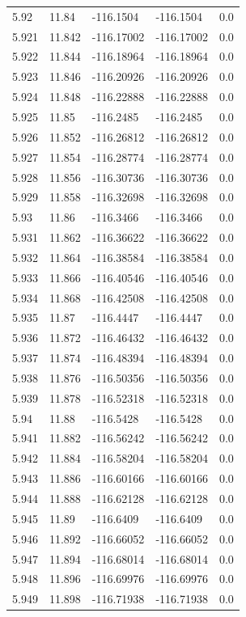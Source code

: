 \begin{tabular}{lllll}
5.92 & 11.84 & -116.1504 & -116.1504 & 0.0 \\
5.921 & 11.842 & -116.17002 & -116.17002 & 0.0 \\
5.922 & 11.844 & -116.18964 & -116.18964 & 0.0 \\
5.923 & 11.846 & -116.20926 & -116.20926 & 0.0 \\
5.924 & 11.848 & -116.22888 & -116.22888 & 0.0 \\
5.925 & 11.85 & -116.2485 & -116.2485 & 0.0 \\
5.926 & 11.852 & -116.26812 & -116.26812 & 0.0 \\
5.927 & 11.854 & -116.28774 & -116.28774 & 0.0 \\
5.928 & 11.856 & -116.30736 & -116.30736 & 0.0 \\
5.929 & 11.858 & -116.32698 & -116.32698 & 0.0 \\
5.93 & 11.86 & -116.3466 & -116.3466 & 0.0 \\
5.931 & 11.862 & -116.36622 & -116.36622 & 0.0 \\
5.932 & 11.864 & -116.38584 & -116.38584 & 0.0 \\
5.933 & 11.866 & -116.40546 & -116.40546 & 0.0 \\
5.934 & 11.868 & -116.42508 & -116.42508 & 0.0 \\
5.935 & 11.87 & -116.4447 & -116.4447 & 0.0 \\
5.936 & 11.872 & -116.46432 & -116.46432 & 0.0 \\
5.937 & 11.874 & -116.48394 & -116.48394 & 0.0 \\
5.938 & 11.876 & -116.50356 & -116.50356 & 0.0 \\
5.939 & 11.878 & -116.52318 & -116.52318 & 0.0 \\
5.94 & 11.88 & -116.5428 & -116.5428 & 0.0 \\
5.941 & 11.882 & -116.56242 & -116.56242 & 0.0 \\
5.942 & 11.884 & -116.58204 & -116.58204 & 0.0 \\
5.943 & 11.886 & -116.60166 & -116.60166 & 0.0 \\
5.944 & 11.888 & -116.62128 & -116.62128 & 0.0 \\
5.945 & 11.89 & -116.6409 & -116.6409 & 0.0 \\
5.946 & 11.892 & -116.66052 & -116.66052 & 0.0 \\
5.947 & 11.894 & -116.68014 & -116.68014 & 0.0 \\
5.948 & 11.896 & -116.69976 & -116.69976 & 0.0 \\
5.949 & 11.898 & -116.71938 & -116.71938 & 0.0 \\

\end{tabular}
